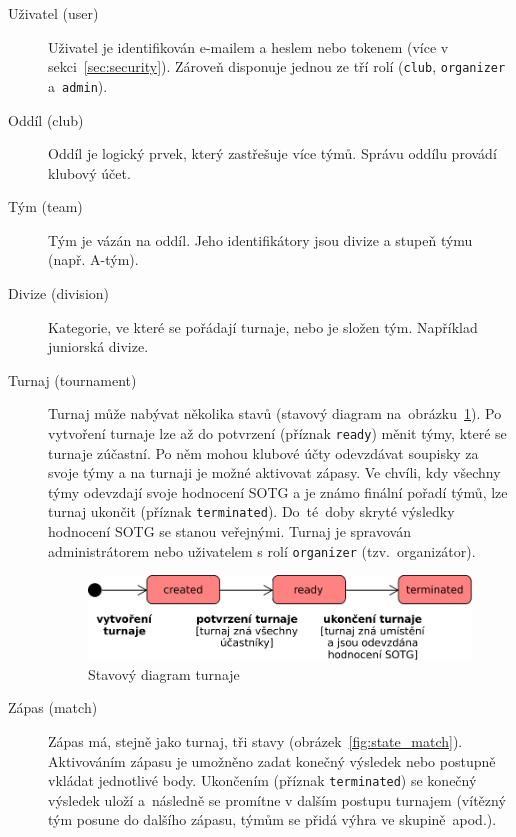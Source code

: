 \begin{description}
  \item[Uživatel (user)]
  Uživatel je identifikován e-mailem a heslem nebo tokenem (více v sekci~\ref{sec:security}).
  Zároveň disponuje jednou ze tří rolí (\texttt{club}, \texttt{organizer} a~\texttt{admin}).
  \item[Oddíl (club)]
  Oddíl je logický prvek, který zastřešuje více týmů. Správu oddílu provádí klubový účet.
  \item[Tým (team)]
  Tým je vázán na oddíl. Jeho identifikátory jsou divize a stupeň týmu (např. A-tým).
  \item[Divize (division)]
  Kategorie, ve které se pořádají turnaje, nebo je složen tým. Například juniorská divize. %
  \item[Turnaj (tournament)]
    Turnaj může nabývat několika stavů (stavový diagram na~obrázku~\ref{fig:state_tournament}).
    Po vytvoření turnaje lze až do potvrzení (příznak \texttt{ready}) měnit týmy, které se turnaje zúčastní.
    Po něm mohou klubové účty odevzdávat soupisky za svoje týmy a na turnaji je možné aktivovat zápasy. Ve chvíli,
    kdy všechny týmy odevzdají svoje hodnocení SOTG a je známo finální pořadí týmů,
    lze turnaj ukončit (příznak \texttt{terminated}). Do~té~doby skryté výsledky hodnocení SOTG se stanou veřejnými.
    Turnaj je spravován administrátorem nebo uživatelem s rolí \texttt{organizer} (tzv.~organizátor).
    \begin{figure}[ht!]
      \centering
      \includegraphics[width=110mm]{./images/stavovy-diagram-turnaj.pdf}
      \caption{Stavový diagram turnaje\label{overflow}}
      \label{fig:state_tournament}
    \end{figure}
  \item[Zápas (match)]
    Zápas má, stejně jako turnaj, tři stavy (obrázek~\ref{fig:state_match}). Akti\-vováním zápasu je umožněno zadat konečný výsledek
    nebo postupně vkládat jednotlivé body. Ukončením (příznak \texttt{terminated}) se konečný výsledek uloží a~následně se promítne
    v dalším postupu turnajem (vítězný tým posune do dalšího zápasu, týmům se přidá výhra ve skupině~apod.).
    \begin{figure}[ht!]

\end{figure}
\end{description}
